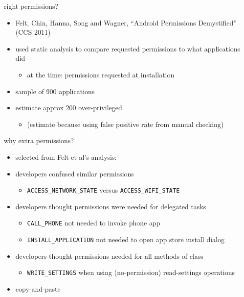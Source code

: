 \begin{frame}{right permissions?}
    \begin{itemize}
    \item Felt, Chin, Hanna, Song and Wagner, ``Android Permissions Demystified'' (CCS 2011)
    \item used static analysis to compare requested permissions to what applications did
        \begin{itemize}
        \item at the time: permissions requested at installation
        \end{itemize}
    \item sample of 900 applications
    \item estimate approx 200 over-privileged
        \begin{itemize}
        \item (estimate because using false positive rate from manual checking)
        \end{itemize}
    \end{itemize}
\end{frame}

\begin{frame}{why extra permissions?}
    \begin{itemize}
    \item selected from Felt et al's analysis:
    \item developers confused similar permissions
        \begin{itemize}
        \item \texttt{ACCESS\_NETWORK\_STATE} versus \texttt{ACCESS\_WIFI\_STATE}
        \end{itemize}
    \item developers thought permissions were needed for delegated tasks
        \begin{itemize}
        \item \texttt{CALL\_PHONE} not needed to invoke phone app
        \item \texttt{INSTALL\_APPLICATION} not needed to open app store install dialog
        \end{itemize}
    \item developers thought permissions needed for all methods of class
        \begin{itemize}
        \item \texttt{WRITE\_SETTINGS} when using (no-permission) read-settings operations
        \end{itemize}
    \item copy-and-paste
    \end{itemize}
\end{frame}
